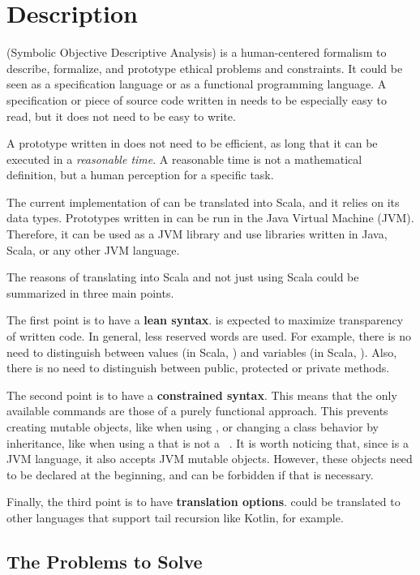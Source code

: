 \chapter{Description}

\Soda (Symbolic Objective Descriptive Analysis) is a human-centered formalism to describe, formalize, and prototype ethical problems and constraints.
It could be seen as a specification language or as a functional programming language.
A specification or piece of source code written in \Soda needs to be especially easy to read, but it does not need to be easy to write.

A prototype written in \Soda does not need to be efficient, as long that it can be executed in a \textit{reasonable time}.
A reasonable time is not a mathematical definition, but a human perception for a specific task.

The current implementation of \Soda can be translated into Scala, and it relies on its data types.
Prototypes written in \Soda can be run in the Java Virtual Machine (JVM).
Therefore, it can be used as a JVM library and use libraries written in Java, Scala, or any other JVM language.

The reasons of translating \Soda into Scala and not just using Scala could be summarized in three main points.

The first point is to have a \textbf{lean syntax}.
\Soda is expected to maximize transparency of written code.
In general, less reserved words are used.
For example, there is no need to distinguish between values (in Scala, \scalaval) and variables (in Scala, \scalavar).
Also, there is no need to distinguish between public, protected or private methods.

The second point is to have a \textbf{constrained syntax}.
This means that the only available commands are those of a purely functional approach.
This prevents creating mutable objects, like when using \scalavar, or changing a class behavior by inheritance, like when using a \scalaclass that is not a \scalacase \ \scalaclass.
It is worth noticing that, since \Soda is a JVM language, it also accepts JVM mutable objects.
However, these objects need to be declared at the beginning, and can be forbidden if that is necessary.

Finally, the third point is to have \textbf{translation options}.
\Soda could be translated to other languages that support tail recursion like Kotlin, for example.


\section{The Problems to Solve}

